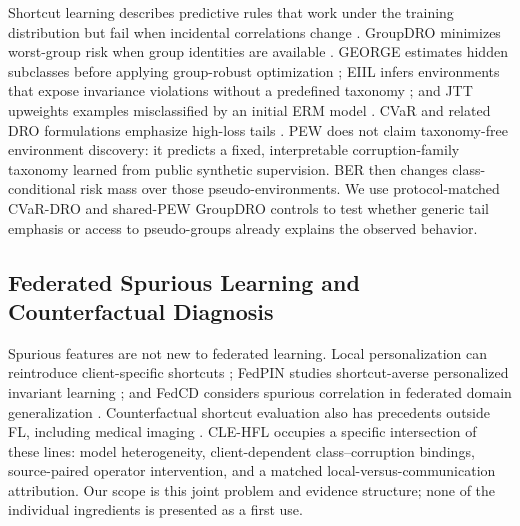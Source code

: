Shortcut learning describes predictive rules that work under the training distribution but fail when incidental correlations change \citep{geirhos2020shortcut}. GroupDRO minimizes worst-group risk when group identities are available \citep{sagawa2020groupdro}. GEORGE estimates hidden subclasses before applying group-robust optimization \citep{sohoni2020george}; EIIL infers environments that expose invariance violations without a predefined taxonomy \citep{creager2021eiil}; and JTT upweights examples misclassified by an initial ERM model \citep{liu2021jtt}. CVaR and related DRO formulations emphasize high-loss tails \citep{rockafellar2000cvar,duchi2021uniform}. PEW does not claim taxonomy-free environment discovery: it predicts a fixed, interpretable corruption-family taxonomy learned from public synthetic supervision. BER then changes class-conditional risk mass over those pseudo-environments. We use protocol-matched CVaR-DRO and shared-PEW GroupDRO controls to test whether generic tail emphasis or access to pseudo-groups already explains the observed behavior.

\subsection{Federated Spurious Learning and Counterfactual Diagnosis}

Spurious features are not new to federated learning. Local personalization can reintroduce client-specific shortcuts \citep{wang2024pflspurious}; FedPIN studies shortcut-averse personalized invariant learning \citep{tang2024fedpin}; and FedCD considers spurious correlation in federated domain generalization \citep{ma2024fedcd}. Counterfactual shortcut evaluation also has precedents outside FL, including medical imaging \citep{vigneshwaran2026counterfactual,jabbour2020chestxray}. CLE-HFL occupies a specific intersection of these lines: model heterogeneity, client-dependent class--corruption bindings, source-paired operator intervention, and a matched local-versus-communication attribution. Our scope is this joint problem and evidence structure; none of the individual ingredients is presented as a first use.
